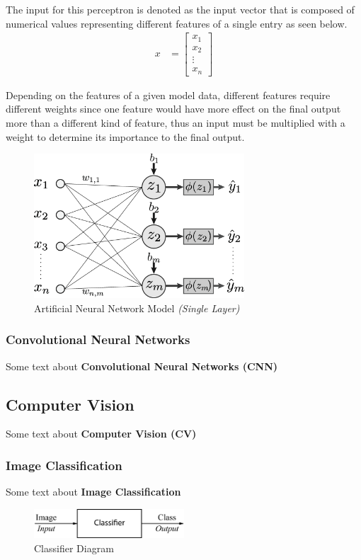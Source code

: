 \documentclass[12pt]{extarticle}
\begin{document}
	The input for this perceptron is denoted as the input vector that is composed of numerical values representing different features of a single entry as seen below.\\
	\begin{align}
	x &= \begin{bmatrix}
		x_1 \\
		x_2 \\
		\vdots \\
		x_n
	\end{bmatrix}
	\end{align}

	Depending on the features of a given model data, different features require different weights since one feature would have more effect on the final output more than a different kind of feature, thus an input must be multiplied with a weight to determine its importance to the final output. 
	
	\begin{figure}[h]
		\centering
		\includegraphics[width=0.7\textwidth]{pics/Figures/ANN.eps}
		\caption{\small{Artificial Neural Network Model \emph{(Single Layer)}}}
		\label{fig:ANN}
	\end{figure}
	
	
	\subsubsection{Convolutional Neural Networks}\label{CNN}	
	Some text about \textbf{Convolutional Neural Networks (CNN)}
	\subsection{Computer Vision}\label{CV}
	Some text about \textbf{Computer Vision (CV)}
	\subsubsection{Image Classification}\label{Classification}
	Some text about \textbf{Image Classification}
	\begin{figure}[h]
		\centering
		\includegraphics[width=0.5\textwidth]{pics/Figures/Classifier_Block_Diagram.eps}
		\caption{\small{Classifier Diagram}}
		\label{fig:Classifier}
	\end{figure}
\end{document}
